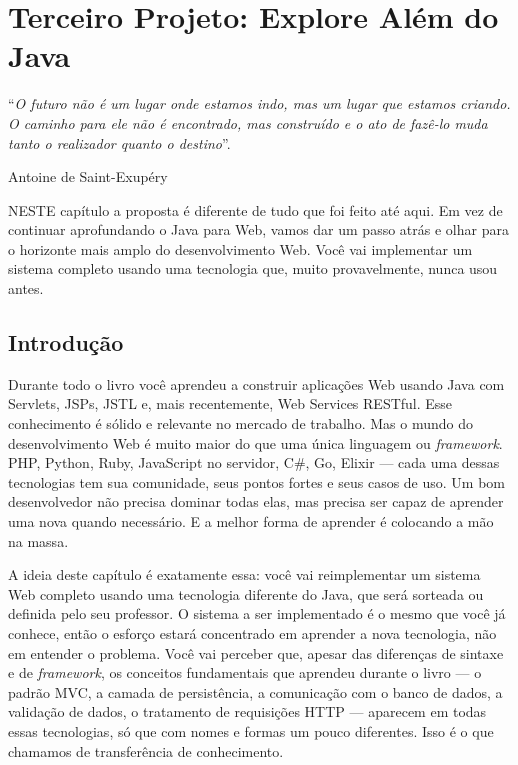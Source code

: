 \chapter{Terceiro Projeto: Explore Além do Java}\label{cap:terceiroProjeto}
\epigraph{``\textit{O futuro não é um lugar onde estamos indo, mas um lugar que estamos criando. O caminho para ele não é encontrado, mas construído e o ato de fazê-lo muda tanto o realizador quanto o destino}''.}{Antoine de Saint-Exupéry}

\lettrine[lines=4, lhang=0.1, lraise=0, loversize=0.2, findent=0.1em]{\textcolor{corTema}{N}}{ESTE} capítulo a proposta é diferente de tudo que foi feito até aqui. Em vez de continuar aprofundando o Java para Web, vamos dar um passo atrás e olhar para o horizonte mais amplo do desenvolvimento Web. Você vai implementar um sistema completo usando uma tecnologia que, muito provavelmente, nunca usou antes.


\section{Introdução}

Durante todo o livro você aprendeu a construir aplicações Web usando Java com Servlets, JSPs, JSTL e, mais recentemente, Web Services RESTful. Esse conhecimento é sólido e relevante no mercado de trabalho. Mas o mundo do desenvolvimento Web é muito maior do que uma única linguagem ou \textit{framework}. PHP, Python, Ruby, JavaScript no servidor, C\#, Go, Elixir --- cada uma dessas tecnologias tem sua comunidade, seus pontos fortes e seus casos de uso. Um bom desenvolvedor não precisa dominar todas elas, mas precisa ser capaz de aprender uma nova quando necessário. E a melhor forma de aprender é colocando a mão na massa.

A ideia deste capítulo é exatamente essa: você vai reimplementar um sistema Web completo usando uma tecnologia diferente do Java, que será sorteada ou definida pelo seu professor. O sistema a ser implementado é o mesmo que você já conhece, então o esforço estará concentrado em aprender a nova tecnologia, não em entender o problema. Você vai perceber que, apesar das diferenças de sintaxe e de \textit{framework}, os conceitos fundamentais que aprendeu durante o livro --- o padrão MVC, a camada de persistência, a comunicação com o banco de dados, a validação de dados, o tratamento de requisições HTTP --- aparecem em todas essas tecnologias, só que com nomes e formas um pouco diferentes. Isso é o que chamamos de transferência de conhecimento.

